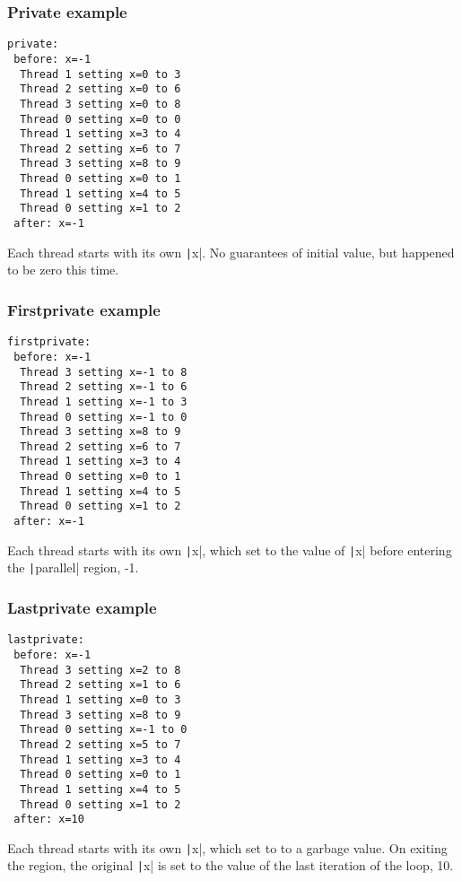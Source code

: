 \documentclass{beamer}
\begin{document}
\begin{frame}[fragile]
\frametitle{Private example}
\begin{verbatim}
private:
 before: x=-1
  Thread 1 setting x=0 to 3
  Thread 2 setting x=0 to 6
  Thread 3 setting x=0 to 8
  Thread 0 setting x=0 to 0
  Thread 1 setting x=3 to 4
  Thread 2 setting x=6 to 7
  Thread 3 setting x=8 to 9
  Thread 0 setting x=0 to 1
  Thread 1 setting x=4 to 5
  Thread 0 setting x=1 to 2
 after: x=-1
\end{verbatim}
Each thread starts with its own \texttt|x|.
No guarantees of initial value, but happened to be zero this time.
\end{frame}

\begin{frame}[fragile]
\frametitle{Firstprivate example}
\begin{verbatim}
firstprivate:
 before: x=-1
  Thread 3 setting x=-1 to 8
  Thread 2 setting x=-1 to 6
  Thread 1 setting x=-1 to 3
  Thread 0 setting x=-1 to 0
  Thread 3 setting x=8 to 9
  Thread 2 setting x=6 to 7
  Thread 1 setting x=3 to 4
  Thread 0 setting x=0 to 1
  Thread 1 setting x=4 to 5
  Thread 0 setting x=1 to 2
 after: x=-1
\end{verbatim}
Each thread starts with its own \texttt|x|, which set to the value of \texttt|x| before entering the \texttt|parallel| region, -1.
\end{frame}

\begin{frame}[fragile]
\frametitle{Lastprivate example}
\begin{verbatim}
lastprivate:
 before: x=-1
  Thread 3 setting x=2 to 8
  Thread 2 setting x=1 to 6
  Thread 1 setting x=0 to 3
  Thread 3 setting x=8 to 9
  Thread 0 setting x=-1 to 0
  Thread 2 setting x=5 to 7
  Thread 1 setting x=3 to 4
  Thread 0 setting x=0 to 1
  Thread 1 setting x=4 to 5
  Thread 0 setting x=1 to 2
 after: x=10
\end{verbatim}
Each thread starts with its own \texttt|x|, which set to to a garbage value.
On exiting the region, the original \texttt|x| is set to the value of the last iteration of the loop, 10.
\end{frame}

\end{document}
